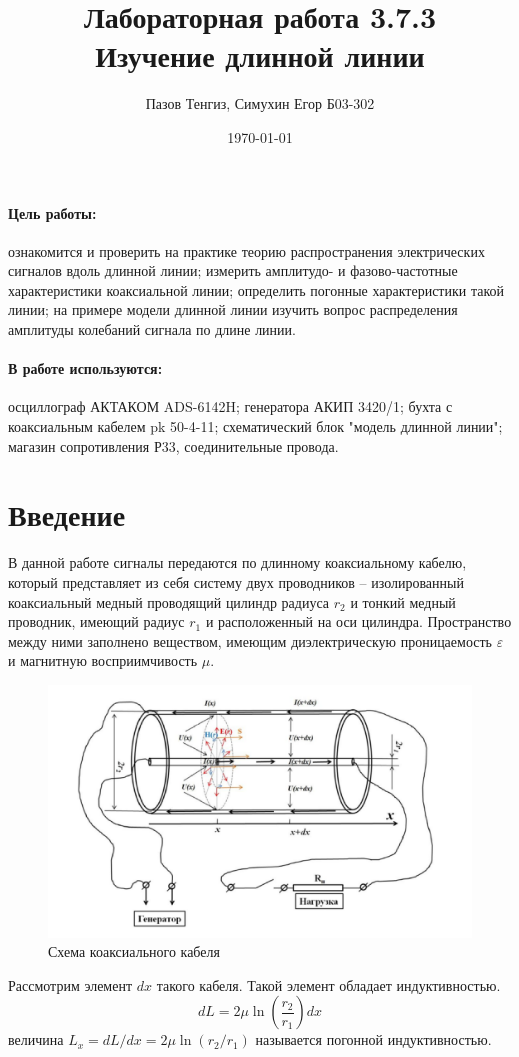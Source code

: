 \documentclass[a4paper,12pt]{article}
\author{Пазов Тенгиз, Симухин Егор Б03-302}
\title{Лабораторная работа 3.7.3 \\
	\textbf{Изучение длинной линии}}
\date{\today}
\theoremstyle{definition}
\begin{document}
	
{\Large \maketitle}

	\paragraph*{Цель работы:} ознакомится и проверить на практике теорию распространения
	электрических сигналов вдоль длинной линии; измерить амплитудо- и фазово-частотные
	характеристики коаксиальной линии; определить погонные характеристики такой
	линии; на примере модели длинной линии изучить вопрос распределения амплитуды
	колебаний сигнала по длине линии.
	\paragraph*{В работе используются:} осциллограф АКТАКОМ ADS-6142H; генератора АКИП 3420/1; бухта с коаксиальным кабелем pk 50-4-11; 
	схематический блок "модель длинной линии"; магазин сопротивления Р33, соединительные провода.

	\section{Введение}
	В данной работе сигналы передаются по длинному коаксиальному кабелю, который представляет из себя систему двух проводников -- изолированный коаксиальный медный проводящий цилиндр радиуса $r_2$ и тонкий медный проводник, имеющий радиус $r_1$ и расположенный на оси цилиндра. Пространство между ними заполнено веществом, имеющим диэлектрическую проницаемость $\varepsilon$ и магнитную восприимчивость $\mu$.
	
	\begin{figure}[h!]
		\centering
		\includegraphics[scale=0.6]{1.png}
		\caption{Схема коаксиального кабеля}
	\end{figure}	
	Рассмотрим элемент $dx$ такого кабеля. Такой элемент обладает индуктивностью.
	\begin{equation}
		dL=2\mu\ln\left(\frac{r_2}{r_1}\right)dx
	\end{equation}
	величина $L_x=dL/dx=2\mu\ln\left(r_2/r_1\right)$ называется погонной индуктивностью.
	
\end{document}
